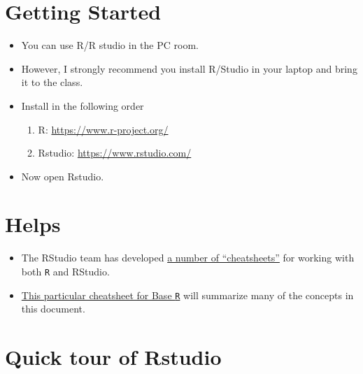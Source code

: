 \documentclass[]{book}
\providecommand{\tightlist}{%
  \setlength{\itemsep}{0pt}\setlength{\parskip}{0pt}}
\begin{document}
\hypertarget{getting-started}{%
\section{Getting Started}\label{getting-started}}

\begin{itemize}
\tightlist
\item
  You can use R/R studio in the PC room.
\item
  However, I strongly recommend you install R/Studio in your laptop and bring it to the class.
\item
  Install in the following order

  \begin{enumerate}
  \def\labelenumi{\arabic{enumi}.}
  \tightlist
  \item
    R: \url{https://www.r-project.org/}
  \item
    Rstudio: \url{https://www.rstudio.com/}
  \end{enumerate}
\item
  Now open Rstudio.
\end{itemize}

\hypertarget{helps}{%
\section{Helps}\label{helps}}

\begin{itemize}
\tightlist
\item
  The RStudio team has developed \href{https://www.rstudio.com/resources/cheatsheets/}{a number of ``cheatsheets''} for working with both \texttt{R} and RStudio.
\item
  \href{http://www.rstudio.com/wp-content/uploads/2016/05/base-r.pdf}{This particular cheatsheet for Base \texttt{R}} will summarize many of the concepts in this document.
\end{itemize}

\hypertarget{quick-tour-of-rstudio}{%
\section{Quick tour of Rstudio}\label{quick-tour-of-rstudio}}
\end{document}
